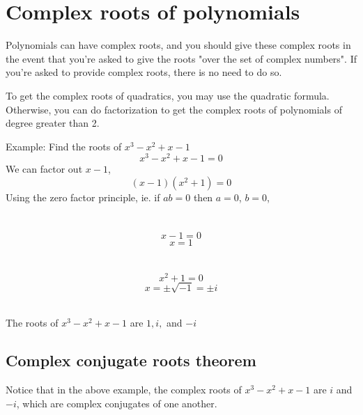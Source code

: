 \documentclass{article}
\begin{document}
\section{Complex roots of polynomials}

Polynomials can have complex roots, and you should give these complex roots in the event that you're asked to give the roots "over the set of complex numbers". If you're asked to provide complex roots, there is no need to do so.

\vspace{\baselineskip}

\noindent To get the complex roots of quadratics, you may use the quadratic formula. Otherwise, you can do factorization to get the complex roots of polynomials of degree greater than 2.

\begin{center}
    Example: Find the roots of $x^3-x^2+x-1$
    $$ x^3-x^2+x-1=0 $$
    We can factor out $x-1$,
    $$ (x-1)(x^2+1) = 0$$
    Using the zero factor principle, ie. if $ab=0$ then $a=0$, $b=0$,
    \begin{multicols}{2}
        \section*{}
        \vspace{-\baselineskip} %
        $$x-1=0$$
        $$x=1$$
    
        \section*{}
        \vspace{-\baselineskip} %
        $$x^2+1=0$$
        $$x=\pm\sqrt{-1}=\pm i$$
    \end{multicols}
    \noindent {} \\
    \vspace{\baselineskip}
    The roots of $x^3-x^2+x-1$ are $1, i,$ and $-i$
\end{center}

\subsection{Complex conjugate roots theorem}
Notice that in the above example, the complex roots of $x^3-x^2+x-1$ are $i$ and $-i$, which are complex conjugates of one another.

\begin{center}
    \noindent {}
\end{center}
\end{document}
